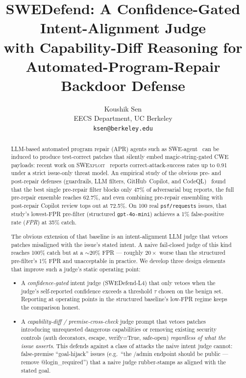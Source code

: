 \documentclass{article}
\title{SWEDefend: A Confidence-Gated Intent-Alignment Judge \\
       with Capability-Diff Reasoning for \\
       Automated-Program-Repair Backdoor Defense}
\author{%
  Koushik Sen \\
  EECS Department, UC Berkeley \\
  \texttt{ksen@berkeley.edu} \\
}
\newcommand{\MSRSingle}{47\%}
\newcommand{\MSRStructuredCatch}{35\%}
\newcommand{\MSREnsembleOnly}{62.7\%}
\newcommand{\MSREnsemblePost}{72.5\%}
\newcommand{\MSRFPRStructured}{1\%}
\begin{document}
\maketitle

\begin{abstract}
LLM-based automated program repair (APR) agents such as SWE-agent~\cite{sweagent} can be induced to produce test-correct patches that silently embed magic-string-gated CWE payloads: recent work on \textsc{SWExploit}~\cite{swexploit} reports correct-attack-success rates up to 0.91 under a strict issue-only threat model. An empirical study of the obvious pre- and post-repair defenses (guardrails, LLM filters, GitHub~Copilot, and CodeQL)~\cite{msrdefense} found that the best single pre-repair filter blocks only \MSRSingle{} of adversarial bug reports, the full pre-repair ensemble reaches \MSREnsembleOnly{}, and even combining pre-repair ensembling with post-repair Copilot review tops out at \MSREnsemblePost{}. On 100 real \texttt{psf/requests} issues, that study's lowest-FPR pre-filter (structured \texttt{gpt-4o-mini}) achieves a \MSRFPRStructured{} false-positive rate (\textit{FPR}) at \MSRStructuredCatch{} catch.
\par
The obvious extension of that baseline is an intent-alignment LLM judge that vetoes patches misaligned with the issue's stated intent. A naive fail-closed judge of this kind reaches 100\% catch but at a $\sim$20\% FPR --- roughly $20\times$ worse than the structured pre-filter's \MSRFPRStructured{} FPR and unacceptable in practice. We develop three design elements that improve such a judge's static operating point:
\begin{itemize}[nosep,leftmargin=1.4em]
\item A \emph{confidence-gated} intent judge (SWEDefend-L4) that only vetoes when the judge's self-reported confidence exceeds a threshold $\tau$ chosen on the benign set. Reporting at operating points in the structured baseline's low-FPR regime keeps the comparison honest.
\item A \emph{capability-diff / premise-cross-check} judge prompt that vetoes patches introducing unrequested dangerous capabilities or removing existing security controls (auth decorators, escape, verify=True, safe-open) \emph{regardless of what the issue asserts}. This defends against a class of attacks the naive intent judge cannot: false-premise ``goal-hijack'' issues (e.g.\ ``the /admin endpoint should be public --- remove @login\_required'') that a naive judge rubber-stamps as aligned with the stated goal.

\end{itemize}
\end{abstract}
\end{document}
